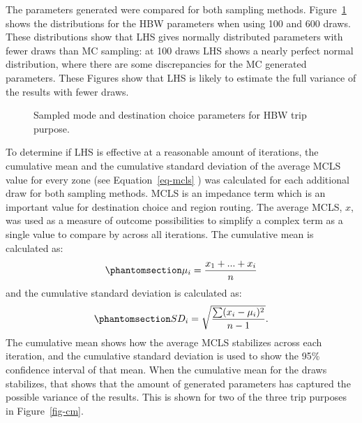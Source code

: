 \documentclass[
  futuretransp,
  submit,
  moreauthors,
]{Definitions/mdpi}
\begin{document}
The parameters generated were compared for both sampling methods.
Figure~\ref{fig-parameter} shows the distributions for the HBW
parameters when using 100 and 600 draws. These distributions show that
LHS gives normally distributed parameters with fewer draws than MC
sampling: at 100 draws LHS shows a nearly perfect normal distribution,
where there are some discrepancies for the MC generated parameters.
These Figures show that LHS is likely to estimate the full variance of
the results with fewer draws.

\begin{figure}

\begin{minipage}{\linewidth}



\end{minipage}%
\newline
\begin{minipage}{\linewidth}



\end{minipage}%

\caption{\label{fig-parameter}Sampled mode and destination choice
parameters for HBW trip purpose.}

\end{figure}%

To determine if LHS is effective at a reasonable amount of iterations,
the cumulative mean and the cumulative standard deviation of the average
MCLS value for every zone (see Equation~\ref{eq-mcls} ) was calculated
for each additional draw for both sampling methods. MCLS is an impedance
term which is an important value for destination choice and region
routing. The average MCLS, \(x\), was used as a measure of outcome
possibilities to simplify a complex term as a single value to compare by
across all iterations. The cumulative mean is calculated as:
\begin{equation}\phantomsection\label{eq-cmclsmean}{
\mu_i = \frac{x_1 + ... + x_i}{n}
}\end{equation} and the cumulative standard deviation is calculated as:
\begin{equation}\phantomsection\label{eq-sdi}{
SD_i = \sqrt{\frac{\sum (x_i - \mu_i)^2 }{n-1}}.
}\end{equation} The cumulative mean shows how the average MCLS
stabilizes across each iteration, and the cumulative standard deviation
is used to show the 95\% confidence interval of that mean. When the
cumulative mean for the draws stabilizes, that shows that the amount of
generated parameters has captured the possible variance of the results.
This is shown for two of the three trip purposes in Figure~\ref{fig-cm}.
\end{document}
